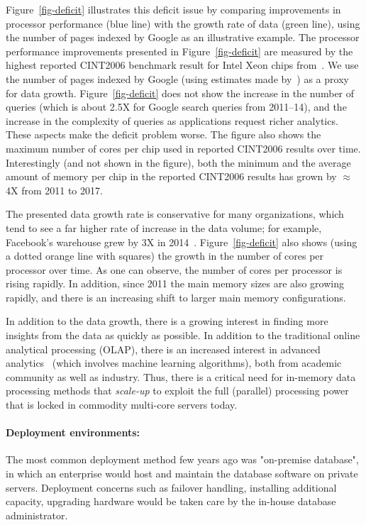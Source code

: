 Figure~\ref{fig-deficit} illustrates this deficit issue by comparing improvements in processor performance (blue line) with the growth rate of data (green line), using the number of pages indexed by Google as an illustrative example. 
The processor performance improvements presented in Figure~\ref{fig-deficit} are measured by the highest reported CINT2006 benchmark result for Intel Xeon chips from~\cite{cpu2006}.
We use the number of pages indexed by Google (using estimates made by~\cite{google-pages-db}) as a proxy for data growth. 
Figure~\ref{fig-deficit} does not show the increase in the number of queries (which is about 2.5X for Google search queries from 2011--14), and the increase in the complexity of queries as applications request richer analytics. These aspects make the deficit problem worse. The figure also shows the maximum number of cores per chip used in reported CINT2006 results over time. Interestingly (and not shown in the figure), both the minimum and the average amount of memory per chip in the reported CINT2006 results has grown by $\approx$4X from 2011 to 2017.

The presented data growth rate is conservative for many organizations, which tend to see a far higher rate of increase in the data volume; for example, Facebook's warehouse grew by 3X in 2014~\cite{fb-growth-14}. 
Figure~\ref{fig-deficit} also shows (using a dotted orange line with squares) the growth in the number of cores per processor over time. 
As one can observe, the number of cores per processor is rising rapidly.
In addition, since 2011 the main memory sizes are also growing rapidly, and there is an increasing shift to larger main memory configurations. 

In addition to the data growth, there is a growing interest in finding more insights from the data as quickly as possible.
In addition to the traditional online analytical processing (OLAP), there is an increased interest in advanced analytics~\cite{DBLP:conf/sigmod/Kumar0017} (which involves machine learning algorithms), both from academic community as well as industry. 
Thus, there is a critical need for in-memory data processing methods that \textit{scale-up} to exploit the full (parallel) processing power that is locked in commodity multi-core servers today.

\paragraph{Deployment environments:} 
The most common deployment method few years ago was "on-premise database", in which an enterprise would host and maintain the database software on private servers. 
Deployment concerns such as failover handling, installing additional capacity, upgrading hardware would be taken care by the in-house database administrator. 

